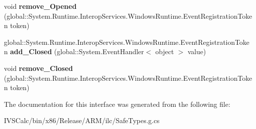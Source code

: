 \begin{DoxyCompactItemize}
\mbox{\label{interface_windows_1_1_u_i_1_1_xaml_1_1_controls_1_1_i_app_bar_a7b13adf7eea94bab04ff42899a53893e}} 
void {\bfseries remove\+\_\+\+Opened} (global\+::\+System.\+Runtime.\+Interop\+Services.\+Windows\+Runtime.\+Event\+Registration\+Token token)
\item 
\mbox{\label{interface_windows_1_1_u_i_1_1_xaml_1_1_controls_1_1_i_app_bar_ab262c6a2bdf436106c956695a7b223cd}} 
global\+::\+System.\+Runtime.\+Interop\+Services.\+Windows\+Runtime.\+Event\+Registration\+Token {\bfseries add\+\_\+\+Closed} (global\+::\+System.\+Event\+Handler$<$ object $>$ value)
\item 
\mbox{\label{interface_windows_1_1_u_i_1_1_xaml_1_1_controls_1_1_i_app_bar_a4d5a9d418800e1ab130394d9ff7e47eb}} 
void {\bfseries remove\+\_\+\+Closed} (global\+::\+System.\+Runtime.\+Interop\+Services.\+Windows\+Runtime.\+Event\+Registration\+Token token)
\end{DoxyCompactItemize}


The documentation for this interface was generated from the following file\+:\begin{DoxyCompactItemize}
\item 
I\+V\+S\+Calc/bin/x86/\+Release/\+A\+R\+M/ilc/Safe\+Types.\+g.\+cs\end{DoxyCompactItemize}
